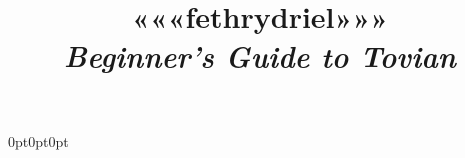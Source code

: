 \documentclass[letterpaper,twocolumn,openany,nodeprecatedcode,hidelinks]{dndbook}
\begin{document}






\title{
    {\fontsize{80pt}{30pt}\tovian «««fethrydriel»»»}\\ %
    \vspace{1in}
    \large \textit{Beginner's Guide to Tovian} \\
    }

\date{}

\newcommand{\continue}[0]{
\newpage
}

\newcommand\blfootnote[1]{%
  \begingroup
  \renewcommand\thefootnote{}\footnotetext{#1}%
  \endgroup
}
\titlespacing*{\subsubsection}
{0pt}{0pt}{0pt}

\newcommand{\ra}[0]{*}
\newcommand{\linkplaceholder}[0]{\subsubsubsection{}}


\newcommand*{\itemrow}[1]{
    \stepcounter{tablectr}%
    \StrSubstitute{#1}{ }{}[\temp] %
    \StrSubstitute{\temp}{'}{}[\templabel] %
    \StrSubstitute{\templabel}{,}{}[\templabel] %
    \label{\templabel} 
    \arabic{tablectr}\subsubsubsection{}\stepcounter{tablectr}-\arabic{tablectr} & \textbf{#1}
}
\end{document}
